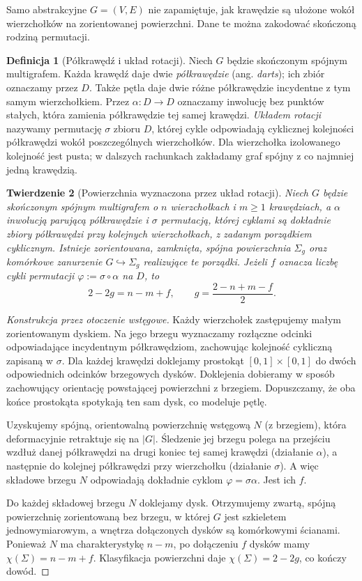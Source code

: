 \documentclass[11pt,a4paper]{report}
\numberwithin{equation}{section}
\theoremstyle{plain}
\newtheorem{twierdzenie}{Twierdzenie}[section]
\theoremstyle{definition}
\newtheorem{definicja}[twierdzenie]{Definicja}
\theoremstyle{remark}
\begin{document}
Samo abstrakcyjne $G=(V,E)$ nie zapamiętuje, jak krawędzie
są ułożone wokół wierzchołków na zorientowanej powierzchni.
Dane te można zakodować skończoną rodziną permutacji.

\begin{definicja}[Półkrawędź i układ rotacji]
Niech $G$ będzie skończonym spójnym multigrafem. Każda
krawędź daje dwie \emph{półkrawędzie} (ang. \emph{darts});
ich zbiór oznaczamy przez $D$. Także pętla daje dwie
różne półkrawędzie incydentne z tym samym wierzchołkiem.
Przez $\alpha:D\to D$ oznaczamy inwolucję bez punktów stałych,
która zamienia półkrawędzie tej samej krawędzi.
\emph{Układem rotacji} nazywamy permutację $\sigma$ zbioru $D$,
której cykle odpowiadają cyklicznej kolejności półkrawędzi
wokół poszczególnych wierzchołków. Dla wierzchołka
izolowanego kolejność jest pusta; w dalszych rachunkach
zakładamy graf spójny z co najmniej jedną krawędzią.
\end{definicja}

\begin{twierdzenie}[Powierzchnia wyznaczona przez układ rotacji]
\label{thm:tg-rotation-genus}
Niech $G$ będzie skończonym spójnym multigrafem o $n$
wierzchołkach i $m\ge1$ krawędziach, a $\alpha$ inwolucją parującą półkrawędzie i $\sigma$
permutacją, której cyklami są dokładnie zbiory półkrawędzi
przy kolejnych wierzchołkach, z zadanym porządkiem cyklicznym. Istnieje zorientowana, zamknięta,
spójna powierzchnia $\Sigma_g$ oraz komórkowe zanurzenie
$G\hookrightarrow\Sigma_g$ realizujące te porządki.
Jeżeli $f$ oznacza liczbę cykli permutacji
$\varphi:=\sigma\circ\alpha$ na $D$, to
\[
 2-2g=n-m+f,
 \qquad g=\frac{2-n+m-f}{2}.
\]
\end{twierdzenie}

\begin{proof}[Konstrukcja przez otoczenie wstęgowe]
Każdy wierzchołek zastępujemy małym zorientowanym
dyskiem. Na jego brzegu wyznaczamy rozłączne odcinki
odpowiadające incydentnym półkrawędziom, zachowując
kolejność cykliczną zapisaną w $\sigma$.
Dla każdej krawędzi doklejamy prostokąt
$[0,1]\times[0,1]$ do dwóch odpowiednich odcinków
brzegowych dysków. Doklejenia dobieramy w sposób
zachowujący orientację powstającej powierzchni z brzegiem.
Dopuszczamy, że oba końce prostokąta spotykają ten sam dysk,
co modeluje pętlę.

Uzyskujemy spójną, orientowalną powierzchnię wstęgową $N$
(z brzegiem), która deformacyjnie retraktuje się na $|G|$.
Śledzenie jej brzegu polega na przejściu wzdłuż danej
półkrawędzi na drugi koniec tej samej krawędzi (działanie
$\alpha$), a następnie do kolejnej półkrawędzi przy
wierzchołku (działanie $\sigma$). A więc składowe brzegu
$N$ odpowiadają dokładnie cyklom $\varphi=\sigma\alpha$.
Jest ich $f$.

Do każdej składowej brzegu $N$ doklejamy dysk.
Otrzymujemy zwartą, spójną powierzchnię zorientowaną
bez brzegu, w której $G$ jest szkieletem jednowymiarowym,
a wnętrza dołączonych dysków są komórkowymi ścianami.
Ponieważ $N$ ma charakterystykę $n-m$, po dołączeniu
$f$ dysków mamy $\chi(\Sigma)=n-m+f$.
Klasyfikacja powierzchni daje $\chi(\Sigma)=2-2g$,
co kończy dowód.
\end{proof}
\end{document}
